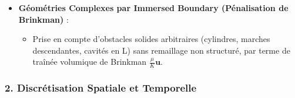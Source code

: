 \documentclass[
  french,
]{article}
\providecommand{\tightlist}{%
  \setlength{\itemsep}{0pt}\setlength{\parskip}{0pt}}
\begin{document}
\begin{itemize}
  \begin{itemize}
  \tightlist
  \item
    Équation de transport de l'énergie thermique (diffusion +
    advection).
  \item
    Couplage thermo-convectif par l'\textbf{approximation de Boussinesq}
    \(\mathbf{f}_b = -\rho \beta (T - T_0) \mathbf{g}\).
  \end{itemize}
\item
  \textbf{Géométries Complexes par Immersed Boundary (Pénalisation de
  Brinkman)} :

  \begin{itemize}
  \tightlist
  \item
    Prise en compte d'obstacles solides arbitraires (cylindres, marches
    descendantes, cavités en L) sans remaillage non structuré, par terme
    de traînée volumique de Brinkman \(\frac{\mu}{K} \mathbf{u}\).
  \end{itemize}
\end{itemize}

\subsubsection{2. Discrétisation Spatiale et
Temporelle}\label{discruxe9tisation-spatiale-et-temporelle}
\end{document}
